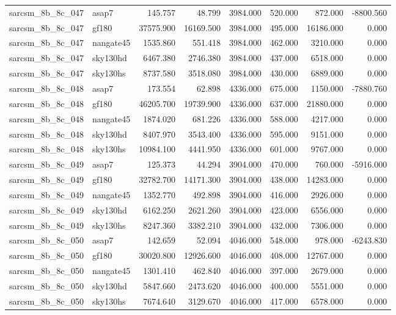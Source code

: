 \begin{tabular}{llrrrrrr}
sarcsm\_8b\_8c\_047 & asap7 & 145.757 & 48.799 & 3984.000 & 520.000 & 872.000 & -8800.560 \\
sarcsm\_8b\_8c\_047 & gf180 & 37575.900 & 16169.500 & 3984.000 & 495.000 & 16186.000 & 0.000 \\
sarcsm\_8b\_8c\_047 & nangate45 & 1535.860 & 551.418 & 3984.000 & 462.000 & 3210.000 & 0.000 \\
sarcsm\_8b\_8c\_047 & sky130hd & 6467.380 & 2746.380 & 3984.000 & 437.000 & 6518.000 & 0.000 \\
sarcsm\_8b\_8c\_047 & sky130hs & 8737.580 & 3518.080 & 3984.000 & 430.000 & 6889.000 & 0.000 \\
sarcsm\_8b\_8c\_048 & asap7 & 173.554 & 62.898 & 4336.000 & 675.000 & 1150.000 & -7880.760 \\
sarcsm\_8b\_8c\_048 & gf180 & 46205.700 & 19739.900 & 4336.000 & 637.000 & 21880.000 & 0.000 \\
sarcsm\_8b\_8c\_048 & nangate45 & 1874.020 & 681.226 & 4336.000 & 588.000 & 4217.000 & 0.000 \\
sarcsm\_8b\_8c\_048 & sky130hd & 8407.970 & 3543.400 & 4336.000 & 595.000 & 9151.000 & 0.000 \\
sarcsm\_8b\_8c\_048 & sky130hs & 10984.100 & 4441.950 & 4336.000 & 601.000 & 9767.000 & 0.000 \\
sarcsm\_8b\_8c\_049 & asap7 & 125.373 & 44.294 & 3904.000 & 470.000 & 760.000 & -5916.000 \\
sarcsm\_8b\_8c\_049 & gf180 & 32782.700 & 14171.300 & 3904.000 & 438.000 & 14283.000 & 0.000 \\
sarcsm\_8b\_8c\_049 & nangate45 & 1352.770 & 492.898 & 3904.000 & 416.000 & 2926.000 & 0.000 \\
sarcsm\_8b\_8c\_049 & sky130hd & 6162.250 & 2621.260 & 3904.000 & 423.000 & 6556.000 & 0.000 \\
sarcsm\_8b\_8c\_049 & sky130hs & 8247.360 & 3382.210 & 3904.000 & 432.000 & 7306.000 & 0.000 \\
sarcsm\_8b\_8c\_050 & asap7 & 142.659 & 52.094 & 4046.000 & 548.000 & 978.000 & -6243.830 \\
sarcsm\_8b\_8c\_050 & gf180 & 30020.800 & 12926.600 & 4046.000 & 408.000 & 12767.000 & 0.000 \\
sarcsm\_8b\_8c\_050 & nangate45 & 1301.410 & 462.840 & 4046.000 & 397.000 & 2679.000 & 0.000 \\
sarcsm\_8b\_8c\_050 & sky130hd & 5847.660 & 2473.620 & 4046.000 & 400.000 & 5551.000 & 0.000 \\
sarcsm\_8b\_8c\_050 & sky130hs & 7674.640 & 3129.670 & 4046.000 & 417.000 & 6578.000 & 0.000 \\

\end{tabular}
